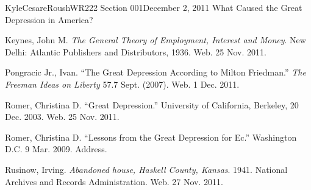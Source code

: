 \documentclass[12pt,letterpaper]{article}
\begin{document}
\begin{mla}{Kyle}{Cesare}{Roush}{WR222 Section 001}{December 2, 2011}{
What Caused the Great Depression in America?}
\begin{workscited}
\bibent Keynes, John M. \emph{The General Theory of Employment, Interest and
Money}.  New Delhi: Atlantic Publishers and Distributors, 1936. Web. 25 Nov.
2011.

\bibent Pongracic Jr., Ivan. ``The Great Depression According to Milton
Friedman.'' \emph{The Freeman Ideas on Liberty} 57.7 Sept. (2007). Web. 1 Dec.
2011.

\bibent Romer, Christina D. ``Great Depression.'' University of California,
Berkeley, 20 Dec. 2003. Web. 25 Nov. 2011.

\bibent Romer, Christina D. ``Lessons from the Great Depression for Ec.''
Washington D.C. 9 Mar. 2009. Address.

\bibent Rusinow, Irving. \emph{Abandoned house, Haskell County, Kansas}. 1941.
National Archives and Records Administration. Web. 27 Nov. 2011.

\end{workscited}
\end{mla}
\end{document}
